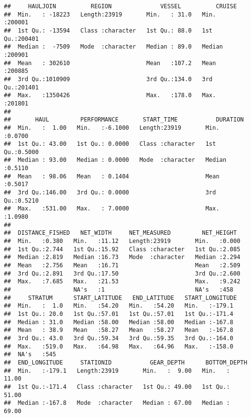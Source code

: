 \documentclass[
]{article}
\begin{document}
\begin{verbatim}
##     HAULJOIN          REGION              VESSEL          CRUISE      
##  Min.   : -18223   Length:23919       Min.   : 31.0   Min.   :200001  
##  1st Qu.: -13594   Class :character   1st Qu.: 88.0   1st Qu.:200401  
##  Median :  -7509   Mode  :character   Median : 89.0   Median :200901  
##  Mean   : 302610                      Mean   :107.2   Mean   :200885  
##  3rd Qu.:1010909                      3rd Qu.:134.0   3rd Qu.:201401  
##  Max.   :1350426                      Max.   :178.0   Max.   :201801  
##                                                                       
##       HAUL         PERFORMANCE       START_TIME           DURATION     
##  Min.   :  1.00   Min.   :-6.1000   Length:23919       Min.   :0.0700  
##  1st Qu.: 43.00   1st Qu.: 0.0000   Class :character   1st Qu.:0.5000  
##  Median : 93.00   Median : 0.0000   Mode  :character   Median :0.5110  
##  Mean   : 98.06   Mean   : 0.1404                      Mean   :0.5017  
##  3rd Qu.:146.00   3rd Qu.: 0.0000                      3rd Qu.:0.5210  
##  Max.   :531.00   Max.   : 7.0000                      Max.   :1.0980  
##                                                                        
##  DISTANCE_FISHED   NET_WIDTH     NET_MEASURED         NET_HEIGHT   
##  Min.   :0.380   Min.   :11.12   Length:23919       Min.   :0.000  
##  1st Qu.:2.744   1st Qu.:15.92   Class :character   1st Qu.:2.085  
##  Median :2.819   Median :16.73   Mode  :character   Median :2.294  
##  Mean   :2.756   Mean   :16.71                      Mean   :2.509  
##  3rd Qu.:2.891   3rd Qu.:17.50                      3rd Qu.:2.600  
##  Max.   :7.685   Max.   :21.53                      Max.   :9.242  
##                  NA's   :1                          NA's   :458    
##     STRATUM      START_LATITUDE   END_LATITUDE   START_LONGITUDE 
##  Min.   :  1.0   Min.   :54.20   Min.   :54.20   Min.   :-179.1  
##  1st Qu.: 20.0   1st Qu.:57.01   1st Qu.:57.01   1st Qu.:-171.4  
##  Median : 31.0   Median :58.00   Median :58.00   Median :-167.8  
##  Mean   : 38.9   Mean   :58.27   Mean   :58.27   Mean   :-167.8  
##  3rd Qu.: 43.0   3rd Qu.:59.34   3rd Qu.:59.35   3rd Qu.:-164.0  
##  Max.   :519.0   Max.   :64.98   Max.   :64.96   Max.   :-158.0  
##  NA's   :545                                                     
##  END_LONGITUDE     STATIONID           GEAR_DEPTH      BOTTOM_DEPTH   
##  Min.   :-179.1   Length:23919       Min.   :  9.00   Min.   : 11.00  
##  1st Qu.:-171.4   Class :character   1st Qu.: 49.00   1st Qu.: 51.00  
##  Median :-167.8   Mode  :character   Median : 67.00   Median : 69.00  

\end{verbatim}
\end{document}
